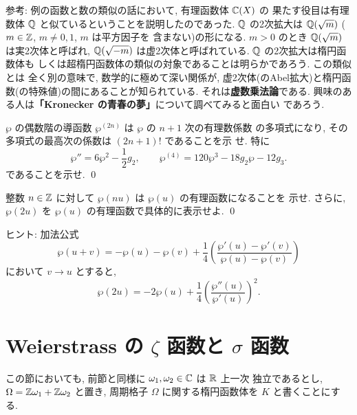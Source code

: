 \documentclass[12pt,twoside]{jarticle}
\def\pe{\wp}
\def\Z{{\Bbb Z}} %
\def\Q{{\Bbb Q}} %
\def\R{{\Bbb R}} %
\def\C{{\Bbb C}} %
\begin{document}
\medskip

\noindent 参考: 例の函数と数の類似の話において, 有理函数体 $\C(X)$ の
果たす役目は有理数体 $\Q$ と似ているということを説明したのであった.
$\Q$ の2次拡大は $\Q(\sqrt{m})$ ($m\in\Z$, $m\ne0,1$, $m$ は平方因子を
含まない)の形になる. $m>0$ のとき $\Q(\sqrt{m})$ は実2次体と呼ばれ, %
$\Q(\sqrt{-m})$ は虚2次体と呼ばれている. $\Q$ の2次拡大は楕円函数体も
しくは超楕円函数体の類似の対象であることは明らかであろう. この類似とは
全く別の意味で, 数学的に極めて深い関係が, 虚2次体(のAbel拡大)と楕円函
数(の特殊値)の間にあることが知られている. それは{\bf 虚数乗法論}である. 
興味のある人は{\bf 「Kronecker の青春の夢」}について調べてみると面白い
であろう.

\medskip

\begin{question}\qstar{*}
  $\pe$ の偶数階の導函数 $\pe^{(2n)}$ は $\pe$ の $n+1$ 次の有理数係数
  の多項式になり, その多項式の最高次の係数は $(2n+1)!$ であることを示
  せ. 特に %
  \[
    \pe'' = 6\pe^2 -\frac{1}{2}g_2, \qquad
    \pe^{(4)} = 120\pe^3 -18g_2\pe -12g_3.
  \]
  であることを示せ. \qed
\end{question}

\begin{question}\qstar{*}
  整数 $n\in\Z$ に対して $\pe(nu)$ は $\pe(u)$ の有理函数になることを
  示せ. さらに, $\pe(2u)$ を $\pe(u)$ の有理函数で具体的に表示せよ. \qed
\end{question}

\noindent ヒント: 加法公式
\[
  \pe(u+v)=
  -\pe(u)-\pe(v)
  +\frac{1}{4}
  \left(\frac{\pe'(u)-\pe'(v)}{\pe(u)-\pe(v)}\right)
\]
において $v\to u$ とすると,
\[
  \pe(2u) = -2 \pe(u)
  + \frac{1}{4} \left(\frac{\pe''(u)}{\pe'(u)}\right)^2.
\]


\section{Weierstrass の $\zeta$ 函数と $\sigma$ 函数}

この節においても, 前節と同様に $\omega_1,\omega_2\in\C$ は $\R$ 上一次
独立であるとし, $\Omega=\Z\omega_1+\Z\omega_2$ と置き, 周期格子 %
$\Omega$ に関する楕円函数体を $K$ と書くことにする.
\end{document}

